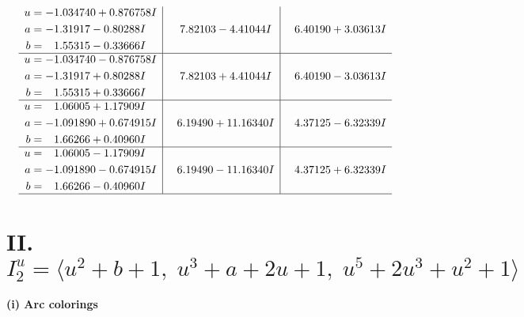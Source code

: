 \documentclass[1p]{elsarticle_modified}
\theoremstyle{definition}
\begin{document}
$$\begin{array}{c|c|c}
\begin{aligned}
u &= -1.034740 + 0.876758 I \\
a &= -1.31917 - 0.80288 I \\
b &= \phantom{-}1.55315 - 0.33666 I\end{aligned}
 & \phantom{-}7.82103 - 4.41044 I & \phantom{-}6.40190 + 3.03613 I \\ \hline\begin{aligned}
u &= -1.034740 - 0.876758 I \\
a &= -1.31917 + 0.80288 I \\
b &= \phantom{-}1.55315 + 0.33666 I\end{aligned}
 & \phantom{-}7.82103 + 4.41044 I & \phantom{-}6.40190 - 3.03613 I \\ \hline\begin{aligned}
u &= \phantom{-}1.06005 + 1.17909 I \\
a &= -1.091890 + 0.674915 I \\
b &= \phantom{-}1.66266 + 0.40960 I\end{aligned}
 & \phantom{-}6.19490 + 11.16340 I & \phantom{-}4.37125 - 6.32339 I \\ \hline\begin{aligned}
u &= \phantom{-}1.06005 - 1.17909 I \\
a &= -1.091890 - 0.674915 I \\
b &= \phantom{-}1.66266 - 0.40960 I\end{aligned}
 & \phantom{-}6.19490 - 11.16340 I & \phantom{-}4.37125 + 6.32339 I\\
 \hline 
 \end{array}$$\newpage\newpage\renewcommand{\arraystretch}{1}
\centering \section*{II. $I^u_{2}= \langle u^2+b+1,\;u^3+a+2 u+1,\;u^5+2 u^3+u^2+1 \rangle$}
\flushleft \textbf{(i) Arc colorings}\\
\end{document}
